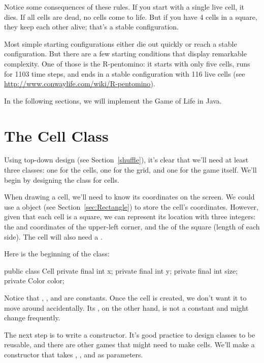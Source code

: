 Notice some consequences of these rules.
If you start with a single live cell, it dies.
If all cells are dead, no cells come to life.
But if you have 4 cells in a square, they keep each other alive; that's a stable configuration.

Most simple starting configurations either die out quickly or reach a stable configuration.
But there are a few starting conditions that display remarkable complexity.
One of those is the R-pentomino: it starts with only five cells, runs for 1103 time steps, and ends in a stable configuration with 116 live cells (see
\url{http://www.conwaylife.com/wiki/R-pentomino}).

In the following sections, we will implement the Game of Life in Java.


\section{The Cell Class}

Using top-down design (see Section~\ref{shuffle}), it's clear that we'll need at least three classes: one for the cells, one for the grid, and one for the game itself.
We'll begin by designing the class for cells.

When drawing a cell, we'll need to know its coordinates on the screen.
We could use a  object (see Section~\ref{sec:Rectangle}) to store the cell's coordinates.
However, given that each cell is a square, we can represent its location with three integers: the  and  coordinates of the upper-left corner, and the  of the square (length of each side).
The cell will also need a .

Here is the beginning of the  class:

\begin{code}
public class Cell {
    private final int x;
    private final int y;
    private final int size;
    private Color color;
}
\end{code}

Notice that , , and  are constants.
Once the cell is created, we don't want it to move around accidentally.
Its , on the other hand, is not a constant and might change frequently.

The next step is to write a constructor.
It's good practice to design classes to be reusable, and there are other games that might need to make cells.
We'll make a constructor that takes , , and  as parameters.


